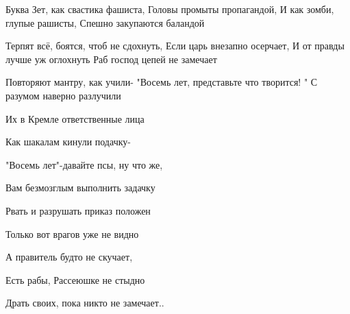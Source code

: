  
 
 
 
 


Буква Зет, как свастика фашиста,  
Головы промыты пропагандой,  
И как зомби, глупые рашисты,  
Спешно закупаются баландой  

Терпят всё, боятся, чтоб не сдохнуть,  
Если царь внезапно осерчает,  
И от правды лучше уж оглохнуть  
Раб господ цепей не замечает  

Повторяют мантру, как учили-  
"Восемь лет, представьте что творится! "  
С разумом наверно разлучили  

Их в Кремле ответственные лица  

 

Как шакалам кинули подачку-  

"Восемь лет"-давайте псы, ну что же,  

Вам безмозглым выполнить задачку  

Рвать и разрушать приказ положен  

 

Только вот врагов уже не видно  

А правитель будто не скучает,  

Есть рабы, Рассеюшке не стыдно  

Драть своих, пока никто не замечает..
